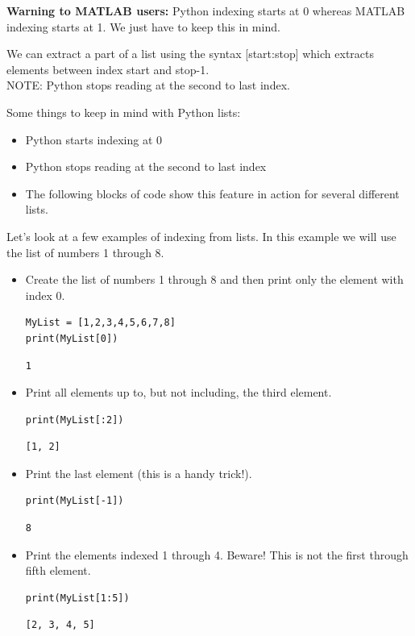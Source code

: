 {\bf Warning to MATLAB users:} Python indexing starts at 0 whereas MATLAB indexing starts
at 1. We just have to keep this in mind.

We can extract a part of a list using the syntax [start:stop] which extracts elements
between index start and stop-1.\\
NOTE: Python stops reading at the second to last index.

Some things to keep in mind with Python lists: 
\begin{itemize}
    \item Python starts indexing at 0
    \item Python stops reading at the second to last index
    \item The following blocks of code show this feature in action for several different lists.
\end{itemize}

\begin{example}
Let's look at a few examples of indexing from lists.  In this example we will use the list
of numbers 1 through 8.
\begin{itemize}
    \item Create the list of numbers 1 through 8 and then print only the element
        with index 0.

\bcode        
\begin{lstlisting}
MyList = [1,2,3,4,5,6,7,8] 
print(MyList[0]) 
\end{lstlisting}
\boutput
\begin{lstlisting}
1
\end{lstlisting}
\item Print all elements up to, but not including, the third element.

\bcode    
\begin{lstlisting}
print(MyList[:2]) 
\end{lstlisting}
\boutput
\begin{lstlisting}
[1, 2]
\end{lstlisting}

\item Print the last element (this is a handy trick!).

\bcode
\begin{lstlisting}
print(MyList[-1]) 
\end{lstlisting}
\boutput
\begin{lstlisting}
8
\end{lstlisting}

\item Print the elements indexed 1 through 4. Beware!  This is not the first through fifth
    element.

\bcode
\begin{lstlisting}
print(MyList[1:5]) 
\end{lstlisting}
\boutput
\begin{lstlisting}
[2, 3, 4, 5]
\end{lstlisting}
\end{itemize}
\end{example}


